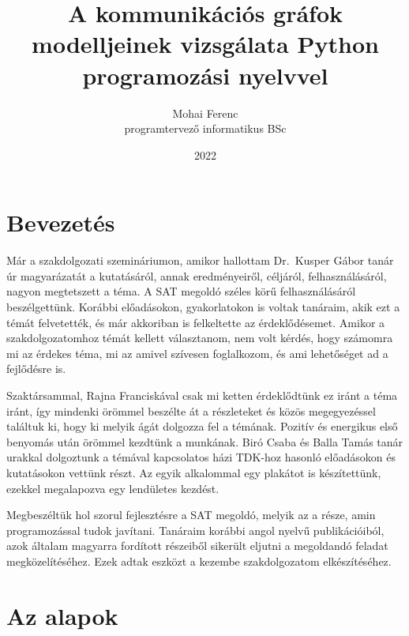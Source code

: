 \documentclass[
]{thesis-ekf}
\theoremstyle{definition}
\theoremstyle{remark}
\begin{document}
	\title{A kommunikációs gráfok modelljeinek vizsgálata Python programozási nyelvvel}
	\author{Mohai Ferenc\\programtervező informatikus BSc}
	\date{2022}
	
	\maketitle
	\tableofcontents
	
\chapter*{Bevezetés}
	Már a szakdolgozati szemináriumon, amikor hallottam Dr.~Kusper Gábor tanár úr magyarázatát a kutatásáról, annak eredményeiről, céljáról, felhasználásáról, nagyon megtetszett a téma.
	A \textsc{SAT} megoldó széles körű felhasználásáról beszélgettünk.
	Korábbi előadásokon, gyakorlatokon is voltak tanáraim, akik ezt a témát felvetették, és már akkoriban is felkeltette az érdeklődésemet.
	Amikor a szakdolgozatomhoz témát kellett választanom, nem volt kérdés, hogy számomra mi az érdekes téma, mi az amivel szívesen foglalkozom, és ami lehetőséget ad a fejlődésre is.

	Szaktársammal, Rajna Franciskával csak mi ketten érdeklődtünk ez iránt a téma iránt, így mindenki örömmel beszélte át a részleteket és közös megegyezéssel találtuk ki, hogy ki melyik ágát dolgozza fel a témának.
	Pozitív és energikus első benyomás után örömmel kezdtünk a munkának. Biró Csaba és Balla Tamás tanár urakkal dolgoztunk a témával kapcsolatos házi TDK-hoz hasonló előadásokon és kutatásokon \cite{am} vettünk részt. Az egyik alkalommal egy plakátot is készítettünk, ezekkel megalapozva egy lendületes kezdést.
	
	Megbeszéltük hol szorul fejlesztésre a \textsc{SAT} megoldó, melyik az a része, amin programozással tudok javítani. Tanáraim korábbi angol nyelvű publikációiból, azok általam magyarra fordított részeiből sikerült eljutni a megoldandó feladat megközelítéséhez. Ezek adtak eszközt a kezembe szakdolgozatom elkészítéséhez.
		
\chapter{Az alapok}
	
\end{document}
